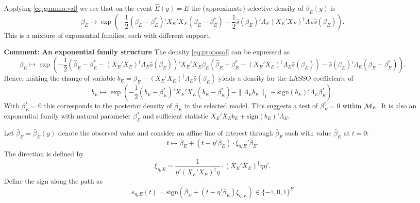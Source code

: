 \documentclass{article}
\newcommand{\OLS}{\bar{\beta}}
\begin{document}
        Applying \eqref{eq:gamma:val} we see that on
        the event $\hat{E}(y)=E$ the (approximate) selective density of
        $\OLS_E(y)$  is
        \begin{equation}
          \label{eq:proposal}
          \beta_E \mapsto \exp\left(-\frac{1}{2} (\beta_E-\beta_E^*)'X_E'X_E(\beta_E-\beta_E^*) - \frac{1}{2}\hat{s}(\beta_E)'\Lambda_E(X_E'X_E)^{\dagger}\Lambda_E\hat{s}(\beta_E)\right).
          \end{equation}
        This is a mixture of exponential families, each with different support. 

        {\bf Comment: An exponential family structure}
        The density \eqref{eq:proposal} can be expressed as
        \begin{equation}
          \label{eq:proposal}
          \beta_E \mapsto \exp\left(-\frac{1}{2} (\hat{\beta}_E - \beta_E^* - (X_E'X_E)^{\dagger}\Lambda_E\hat{s}(\beta_E))'X_E'X_E\beta_E (\hat{\beta}_E - \beta_E^* - (X_E'X_E)^{\dagger}\Lambda_E\hat{s}(\beta_E)) -\hat{s}(\beta_E)'\Lambda_E(\beta_E-\beta_E^*)\right).
          \end{equation}
        Hence, making the change of variable $b_E=\beta_E - (X_E'X_E)^{\dagger}\Lambda_E \hat{s}(\beta_E)$ yields
        a density for the LASSO coefficients of
        \begin{equation}
          \label{eq:exp:family}
          b_E \mapsto \exp\left(-\frac{1}{2} (b_E-\beta_E^*)'X_E'X_E(b_E-\beta_E^*) - \|\Lambda_Eb_E\|_1 + \text{sign}(b_E)'\Lambda_E\beta_E^*\right).
        \end{equation}
          With $\beta_E^*=0$ this
          corresponds to the posterior density of $\beta_E$ in the selected model.
          This suggests a test of $\beta_E^*=0$ within ${\cal M}_E$. It is also an exponential
          family with natural parameter $\beta_E^*$
          and sufficient statistic $X_E'X_Eb_E + \text{sign}(b_E)'\Lambda_E$. 

        Let $\OLS_E=\OLS_E(y)$ denote the observed value and consider an affine line of interest through
        $\OLS_E$ such with value $\OLS_E$ at $t=0$:
        $$t \mapsto \OLS_E + (t- \eta'\OLS_E) \cdot \xi_{\eta,E}' \OLS_E.$$
        The direction is defined by $$
        \xi_{\eta,E} = \frac{1}{\eta'(X_E'X_E)^{\dagger}\eta} \cdot (X_E'X_E)^{\dagger} \eta \eta'.
        $$ 
        Define the sign along the path as
        $$
        \bar{s}_{\eta,E}(t) = \textrm{sign}\left( \OLS_E + (t - \eta'\OLS_E) \xi_{\eta,E} \right)
        \in \{-1,0,1\}^E
        $$
\end{document}
